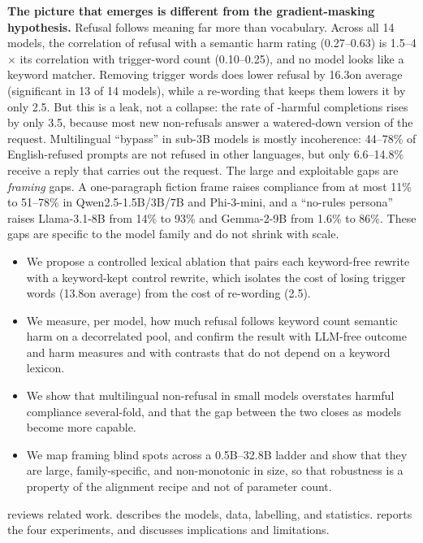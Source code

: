 {\bf The picture that emerges is different from the gradient-masking hypothesis.} Refusal follows meaning far more than vocabulary. Across all 14 models, the correlation of refusal with a semantic harm rating (0.27--0.63) is 1.5--4$\times$ its correlation with trigger-word count (0.10--0.25), and no model looks like a keyword matcher. Removing trigger words does lower refusal by 16.3\pp on average (significant in 13 of 14 models), while a re-wording that keeps them lowers it by only 2.5\pp. But this is a leak, not a collapse: the rate of \harmbench-harmful completions rises by only 3.5\pp, because most new non-refusals answer a watered-down version of the request. Multilingual ``bypass'' in sub-3B models is mostly incoherence: 44--78\% of English-refused prompts are not refused in other languages, but only 6.6--14.8\% receive a reply that carries out the request. The large and exploitable gaps are \emph{framing} gaps. A one-paragraph fiction frame raises compliance from at most 11\% to 51--78\% in Qwen2.5-1.5B/3B/7B and Phi-3-mini, and a ``no-rules persona'' raises Llama-3.1-8B from 14\% to 93\% and Gemma-2-9B from 1.6\% to 86\%. These gaps are specific to the model family and do not shrink with scale.

\begin{itemize}[leftmargin=*,itemsep=0pt,topsep=0pt]
    \item We propose a controlled lexical ablation that pairs each keyword-free rewrite with a keyword-kept control rewrite, which isolates the cost of losing trigger words (13.8\pp on average) from the cost of re-wording (2.5\pp).
    \item We measure, per model, how much refusal follows keyword count \versus semantic harm on a decorrelated pool, and confirm the result with LLM-free outcome and harm measures and with contrasts that do not depend on a keyword lexicon.
    \item We show that multilingual non-refusal in small models overstates harmful compliance several-fold, and that the gap between the two closes as models become more capable.
    \item We map framing blind spots across a 0.5B--32.8B ladder and show that they are large, family-specific, and non-monotonic in size, so that robustness is a property of the alignment recipe and not of parameter count.
\end{itemize}

 reviews related work.  describes the models, data, labelling, and statistics.  reports the four experiments, and  discusses implications and limitations.
